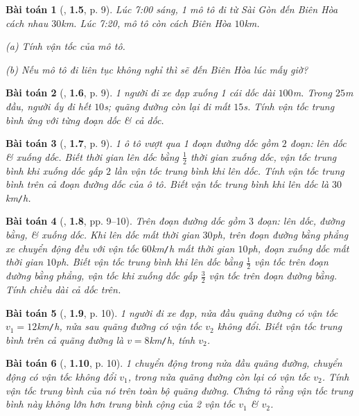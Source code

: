 \documentclass{article}
\numberwithin{equation}{section}
\newtheorem{baitoan}{Bài toán}[section]
\begin{document}
\begin{baitoan}[\cite{Van2022}, \textbf{1.5}, p. 9]
	Lúc 7:00 sáng, 1 mô tô đi từ Sài Gòn đến Biên Hòa cách nhau $30$\emph{km}. Lúc 7:20, mô tô còn cách Biên Hòa $10$\emph{km}.
	\begin{enumerate*}
		\item[(a)] Tính vận tốc của mô tô.
		\item[(b)] Nếu mô tô đi liên tục không nghỉ thì sẽ đến Biên Hòa lúc mấy giờ?
	\end{enumerate*}
\end{baitoan}

\begin{baitoan}[\cite{Van2022}, \textbf{1.6}, p. 9]
	1 người đi xe đạp xuống 1 cái dốc dài $100$\emph{m}. Trong $25$\emph{m} đầu, người ấy đi hết $10$\emph{s}; quãng đường còn lại đi mất $15$\emph{s}. Tính vận tốc trung bình ứng với từng đoạn dốc \& cả dốc.
\end{baitoan}

\begin{baitoan}[\cite{Van2022}, \textbf{1.7}, p. 9]
	1 ô tô vượt qua 1 đoạn đường dốc gồm $2$ đoạn: lên dốc \& xuống dốc. Biết thời gian lên dốc bằng $\frac{1}{2}$ thời gian xuống dốc, vận tốc trung bình khi xuống dốc gấp $2$ lần vận tốc trung bình khi lên dốc. Tính vận tốc trung bình trên cả đoạn đường dốc của ô tô. Biết vận tốc trung bình khi lên dốc là $30$\emph{km\texttt{/}h}.
\end{baitoan}

\begin{baitoan}[\cite{Van2022}, \textbf{1.8}, pp. 9--10]
	Trên đoạn đường dốc gồm $3$ đoạn: lên dốc, đường bằng, \& xuống dốc. Khi lên dốc mất thời gian $30$\emph{ph}, trên đoạn đường bằng phẳng xe chuyển động đều với vận tốc $60$\emph{km\texttt{/}h} mất thời gian $10$\emph{ph}, đoạn xuống dốc mất thời gian $10$\emph{ph}. Biết vận tốc trung bình khi lên dốc bằng $\frac{1}{2}$ vận tốc trên đoạn đường bằng phẳng, vận tốc khi xuống dốc gấp $\frac{3}{2}$ vận tốc trên đoạn đường bằng. Tính chiều dài cả dốc trên.
\end{baitoan}

\begin{baitoan}[\cite{Van2022}, \textbf{1.9}, p. 10]
	1 người đi xe đạp, nửa đầu quãng đường có vận tốc $v_1 = 12$\emph{km\texttt{/}h}, nửa sau quãng đường có vận tốc $v_2$ không đổi. Biết vận tốc trung bình trên cả quãng đường là $v = 8$\emph{km\texttt{/}h}, tính $v_2$.
\end{baitoan}

\begin{baitoan}[\cite{Van2022}, \textbf{1.10}, p. 10]
	1 chuyển động trong nửa đầu quãng đường, chuyển động có vận tốc không đổi $v_1$, trong nửa quãng đường còn lại có vận tốc $v_2$. Tính vận tốc trung bình của nó trên toàn bộ quãng đường. Chứng tỏ rằng vận tốc trung bình này không lớn hơn trung bình cộng của 2 vận tốc $v_1$ \& $v_2$.
\end{baitoan}
\end{document}
